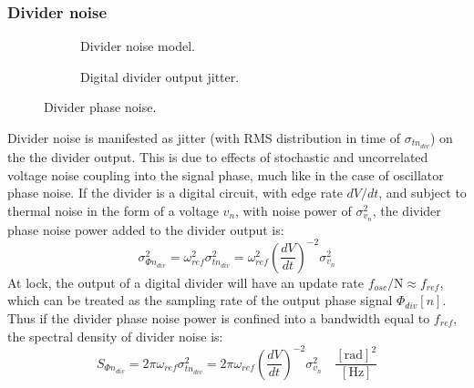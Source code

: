 	\subsubsection{Divider noise}
		\begin{figure}[htb!]
		    \centering
		    \begin{subfigure}{0.5\textwidth}
		        \centering
		        
		        \caption{Divider noise model.}
		        \label{fig:div_pn_model}
		    \end{subfigure}%
		    \begin{subfigure}{0.5\textwidth}
		        \centering
		        
		        \caption{Digital divider output jitter.}
		        \label{fig:div_jitter}
		    \end{subfigure}
		    \label{fig:div_pn}
		    \caption{Divider phase noise.}
		\end{figure}
		\FloatBarrier
		Divider noise is manifested as jitter (with RMS distribution in time of $\sigma_{t n_{div}}$) on the the divider output. This is due to effects of stochastic and uncorrelated voltage noise coupling into the signal phase, much like in the case of oscillator phase noise. If the divider is a digital circuit, with edge rate $dV/dt$, and subject to thermal noise in the form of a  voltage $v_n$, with noise power of $\sigma_{v_n}^2$, the divider phase noise power added to the divider output is:
		\begin{equation}
			\sigma_{\Phi n_{div}}^2 = \omega^2_{ref}\sigma^2_{t n_{div}}  =\omega^2_{ref}\left(\frac{dV}{dt}\right)^{-2}\sigma_{v_n}^2
		\end{equation}
		At lock, the output of a digital divider will have an update rate $f_{{osc}}/\mathrm{N} \approx f_{ref}$, which can be treated as the sampling rate of the output phase signal $\Phi_{div}[n]$. Thus if the divider phase noise power is confined into a bandwidth equal to $f_{ref}$, the spectral density of divider noise is:
		\begin{equation}
			S_{\Phi n_{div}} = 2\pi\omega_{ref}\sigma^2_{t n_{div}}  =2\pi\omega_{ref}\left(\frac{dV}{dt}\right)^{-2}\sigma_{v_n}^2\hspace{1em}\frac{[\text{rad}]^2}{[\text{Hz}]}
		\end{equation}

